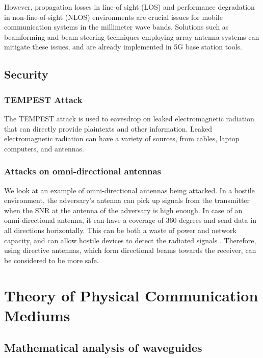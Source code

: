 \documentclass[a4paper,12pt]{report}
\begin{document}
However, propagation losses in line-of sight (LOS) and
performance degradation in non-line-of-sight (NLOS)
environments are crucial issues for mobile communication
systems in the millimeter wave bands. 
Solutions such as beamforming and
beam steering techniques employing array antenna systems
can mitigate these issues, and are
already implemented in 5G base station tools.
\cite{https://doi.org/10.48550/arxiv.2001.05021}

\section{Security}

\subsection{TEMPEST Attack}

The TEMPEST attack is used to eavesdrop on
leaked electromagnetic radiation that can directly
provide plaintexts and other information.
Leaked electromagnetic radiation can have a variety of sources,
from cables, laptop computers, and antennas.

\subsection{Attacks on omni-directional antennas}

We look at an example of omni-directional antennas being attacked.
In a hostile environment, the adversary's antenna can pick up signals from the
transmitter when the SNR at the antenna of the adversary is high enough.
In case of an omni-directional antenna, it can have a coverage of 360 degrees
and send data in all directions horizontally.
This can be both a waste of power and network capacity,
and can allow hostile devices to detect the radiated signals \cite{security_estimation_model}.
Therefore, using directive antennas, which form directional beams towards the receiver,
can be considered to be more safe.

\chapter{Theory of Physical Communication Mediums}

\section{Mathematical analysis of waveguides}
\end{document}
